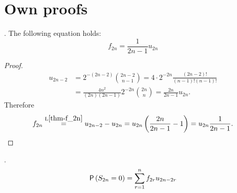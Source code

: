 \chapter{Own proofs}
\begin{lemma}\label{lemma-f_2n=frac}
  \Lrws. The following equation holds:
 \[
 f_{2n}=\frac{1}{2n-1}u_{2n}
 \]
\end{lemma}
\begin{proof}
 \[
  \begin{split}
    u_{2n-2} & =2^{-(2n-2)}\binom{2n-2}{n-1}=4\cdot 2^{-2n} \frac{ \left( 2n-2 \right) !}{ \left( n-1 \right) ! \left( n-1 \right) !}\\
    & =\frac{4n^2}{ \left( 2n \right) \left( 2n-1 \right) }2^{-2n}\binom{2n}{n}
    =\frac{2n}{2n-1}u_{2n}.
  \end{split}
 \]
 Therefore
 \[
 f_{2n} \overset{\text{L}\ref{thm-f_2n}}{=} u_{2n-2}-u_{2n}=u_{2n} \left( \frac{2n}{2n-1}-1 \right)
 =u_{2n}\frac{1}{2n-1}.
 \]
\end{proof}

\begin{lemma}[Decomposition of $f_n$]\label{lemma-decomposition_f_n}
  \Lrws.
  \[
  \pr\left(S_{2n}=0\right)=\suma[r][1][n] f_{2r}u_{2n-2r}
  \]
\end{lemma}

